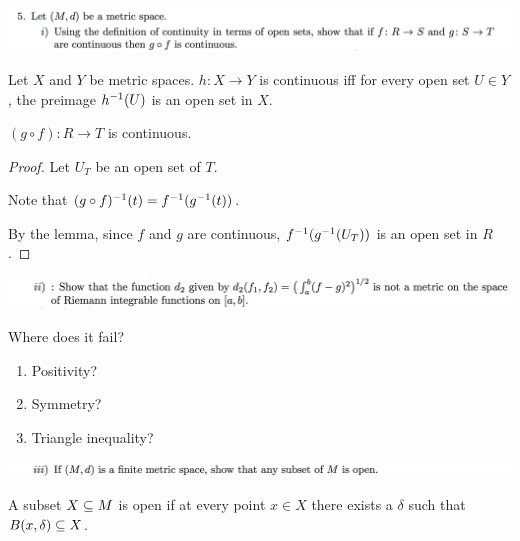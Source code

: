 \documentclass[12pt]{article}
\begin{document}
\newpage
\begin{mdframed}
\includegraphics[width=400pt]{img/oxford-a2-1-5-1.png}
\end{mdframed}

\begin{lemma*}
  Let $X$ and $Y$ be metric spaces. $h:X \to Y$ is continuous iff for every open set $U \in Y$, the
  preimage $h^{-1}(U)$ is an open set in $X$.
\end{lemma*}

\begin{claim*}
  $(g \circ f):R \to T$ is continuous.
\end{claim*}

\begin{proof}
Let $U_T$ be an open set of $T$.

Note that $(g \circ f)^{-1}(t) = f^{-1}(g^{-1}(t))$.

By the lemma, since $f$ and $g$ are continuous, $f^{-1}(g^{-1}(U_T))$ is an open set in $R$.
\end{proof}

\begin{mdframed}
\includegraphics[width=400pt]{img/oxford-a2-1-5-2.png}
\end{mdframed}

Where does it fail?

\begin{enumerate}
\item Positivity?
\item Symmetry?
\item Triangle inequality?
\end{enumerate}

\begin{mdframed}
\includegraphics[width=400pt]{img/oxford-a2-1-5-3.png}
\end{mdframed}

\begin{definition*}
  A subset $X \subseteq M$ is open if at every point $x \in X$ there exists a $\delta$ such that
  $B(x, \delta) \subseteq X$.
\end{definition*}
\end{document}
